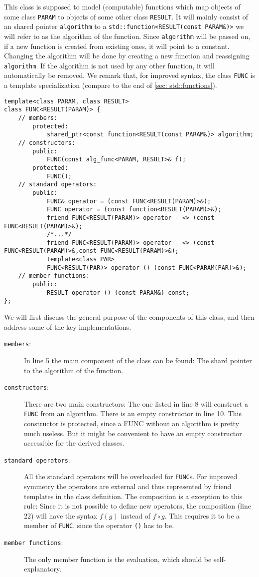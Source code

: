\documentclass{article}
\newcommand{\code}[1]{\texttt{#1}}
\newcommand{\func}[1]{\texttt{#1}}
\begin{document}
This class is supposed to model (computable) functions which map objects of some class \code{PARAM} to objects of some other class \code{RESULT}. It will mainly consist of an shared pointer \code{algorithm} to a \code{std::function<RESULT(const PARAM\&)>} we will refer to as the algorithm of the function. Since \code{algorithm} will be passed on, if a new function is created from existing ones, it will point to a constant. Changing the algorithm will be done by creating a new function and reassigning \code{algorithm}. If the algorithm is not used by any other function, it will automatically be removed. We remark that, for improved syntax, the class \func{FUNC} is a template specialization (compare to the end of \cref{sec: std::functions}).
\begin{lstlisting}
template<class PARAM, class RESULT>
class FUNC<RESULT(PARAM)> {
	// members:
		protected:
			shared_ptr<const function<RESULT(const PARAM&)> algorithm;
	// constructors:
		public:
			FUNC(const alg_func<PARAM, RESULT>& f);
		protected:
			FUNC();
	// standard operators:
		public:
			FUNC& operator = (const FUNC<RESULT(PARAM)>&);
			FUNC operator = (const function<RESULT(PARAM)>&);
			friend FUNC<RESULT(PARAM)> operator - <> (const FUNC<RESULT(PARAM)>&);
			/*...*/
			friend FUNC<RESULT(PARAM)> operator - <> (const FUNC<RESULT(PARAM)>&,const FUNC<RESULT(PARAM)>&);
			template<class PAR>
			FUNC<RESULT(PAR)> operator () (const FUNC<PARAM(PAR)>&);
	// member functions:
		public:
			RESULT operator () (const PARAM&) const;
};
\end{lstlisting}
We will first discuss the general purpose of the components of this class, and then address some of the key implementations.
\begin{description}
\item[\code{members}:] In line 5 the main component of the class can be found: The shard pointer to the algorithm of the function.
\item[\code{constructors}:] There are two main constructors: The one listed in line 8 will construct a \func{FUNC} from an algorithm. There is an empty constructor in line 10. This constructor is protected, since a FUNC without an algorithm is pretty much useless. But it might be convenient to have an empty constructor accessible for the derived classes.
\item[\code{standard operators}:] All the standard operators will be overloaded for \func{FUNC}s. For improved symmetry the operators are external and thus represented by friend templates in the class definition. The composition is a exception to this rule: Since it is not possible to define new operators, the composition (line 22) will have the syntax $f(g)$ instead of $f\circ g$. This requires it to be a member of \func{FUNC}, since the operator \code{()} has to be.
\item[\code{member functions}:] The only member function is the evaluation, which should be self-explanatory.
\end{description}
\end{document}
